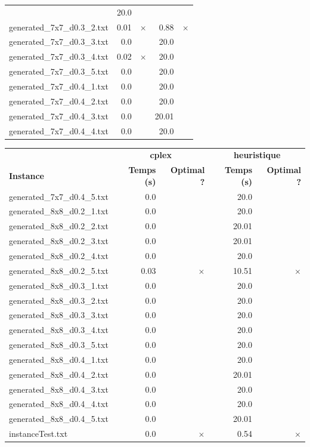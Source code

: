 \documentclass{article}
\begin{document}
\begin{center}
\begin{tabular}{lrrrr}
 & 20.0 & 
\\
generated\_7x7\_d0.3\_2.txt & 0.01 & 
$\times$
 & 0.88 & 
$\times$
\\
generated\_7x7\_d0.3\_3.txt & 0.0 & 
 & 20.0 & 
\\
generated\_7x7\_d0.3\_4.txt & 0.02 & 
$\times$
 & 20.0 & 
\\
generated\_7x7\_d0.3\_5.txt & 0.0 & 
 & 20.0 & 
\\
generated\_7x7\_d0.4\_1.txt & 0.0 & 
 & 20.0 & 
\\
generated\_7x7\_d0.4\_2.txt & 0.0 & 
 & 20.0 & 
\\
generated\_7x7\_d0.4\_3.txt & 0.0 & 
 & 20.01 & 
\\
generated\_7x7\_d0.4\_4.txt & 0.0 & 
 & 20.0 & 
\\
\hline\end{tabular}
\end{center}

\newpage
\begin{center}
\renewcommand{\arraystretch}{1.4} 
 \begin{tabular}{lrrrr}
	\hline
 & \multicolumn{2}{c}{\textbf{cplex}} & \multicolumn{2}{c}{\textbf{heuristique}}\\
\textbf{Instance}  & \textbf{Temps (s)} & \textbf{Optimal ?}  & \textbf{Temps (s)} & \textbf{Optimal ?} \\\hline

generated\_7x7\_d0.4\_5.txt & 0.0 & 
 & 20.0 & 
\\
generated\_8x8\_d0.2\_1.txt & 0.0 & 
 & 20.0 & 
\\
generated\_8x8\_d0.2\_2.txt & 0.0 & 
 & 20.01 & 
\\
generated\_8x8\_d0.2\_3.txt & 0.0 & 
 & 20.01 & 
\\
generated\_8x8\_d0.2\_4.txt & 0.0 & 
 & 20.0 & 
\\
generated\_8x8\_d0.2\_5.txt & 0.03 & 
$\times$
 & 10.51 & 
$\times$
\\
generated\_8x8\_d0.3\_1.txt & 0.0 & 
 & 20.0 & 
\\
generated\_8x8\_d0.3\_2.txt & 0.0 & 
 & 20.0 & 
\\
generated\_8x8\_d0.3\_3.txt & 0.0 & 
 & 20.0 & 
\\
generated\_8x8\_d0.3\_4.txt & 0.0 & 
 & 20.0 & 
\\
generated\_8x8\_d0.3\_5.txt & 0.0 & 
 & 20.0 & 
\\
generated\_8x8\_d0.4\_1.txt & 0.0 & 
 & 20.0 & 
\\
generated\_8x8\_d0.4\_2.txt & 0.0 & 
 & 20.01 & 
\\
generated\_8x8\_d0.4\_3.txt & 0.0 & 
 & 20.0 & 
\\
generated\_8x8\_d0.4\_4.txt & 0.0 & 
 & 20.0 & 
\\
generated\_8x8\_d0.4\_5.txt & 0.0 & 
 & 20.01 & 
\\
instanceTest.txt & 0.0 & 
$\times$
 & 0.54 & 
$\times$
\\
\hline\end{tabular}
\end{center}
\end{document}
